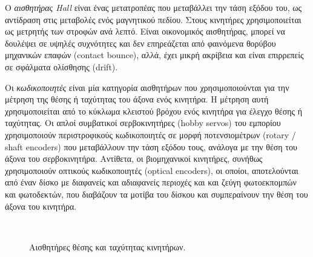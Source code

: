 \begin{enumerate}
Ο \textit{αισθητήρας Hall} είναι ένας μετατροπέας που μεταβάλλει την τάση εξόδου του, ως αντίδραση στις μεταβολές ενός μαγνητικού πεδίου. Στους κινητήρες χρησιμοποιείται ως μετρητής των στροφών ανά λεπτό. Είναι οικονομικός αισθητήρας, μπορεί να δουλέψει σε υψηλές συχνότητες και δεν επηρεάζεται από φαινόμενα θορύβου μηχανικών επαφών (contact bounce), αλλά, έχει μικρή ακρίβεια και είναι επιρρεπείς σε σφάλματα ολίσθησης (drift).

Οι \textit{κωδικοποιητές} είναι μία κατηγορία αισθητήρων που χρησιμοποιούνται για την μέτρηση της θέσης ή ταχύτητας του άξονα ενός κινητήρα. Η μέτρηση αυτή χρησιμοποιείται από το κύκλωμα κλειστού βρόχου ενός κινητήρα για έλεγχο θέσης ή ταχύτητας. Οι απλοί {συμβατικοί σερβοκινητήρες (hobby servos)} του εμπορίου χρησιμοποιούν {περιστροφικούς κωδικοποιητές} σε μορφή ποτενσιομέτρων ({rotary / shaft encoders}) που μεταβάλλουν την τάση εξόδου τους, ανάλογα με την θέση του άξονα του σερβοκινητήρα. Αντίθετα, οι {βιομηχανικοί κινητήρες}, συνήθως χρησιμοποιούν {οπτικούς κωδικοποιητές (optical encoders)}, οι οποίοι, αποτελούνται από έναν δίσκο με διαφανείς και αδιαφανείς περιοχές και και ζεύγη φωτοεκπομπών και φωτοδεκτών, που διαβάζουν τα μοτίβα του δίσκου και συμπεραίνουν την θέση του άξονα του κινητήρα.

\begin{figure}[!ht]
	\centering
	\\
	\caption{Αισθητήρες θέσης και ταχύτητας κινητήρων.}
\end{figure}



\end{enumerate}
